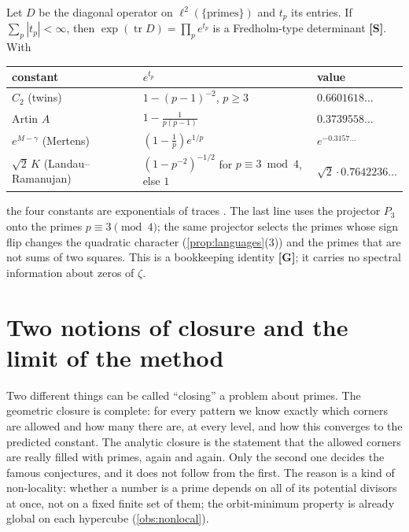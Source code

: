\documentclass[11pt,a4paper]{article}
\newcommand{\statS}{\textsf{\textbf{[S]}}}
\newcommand{\statG}{\textsf{\textbf{[G]}}}
\theoremstyle{plain}
\theoremstyle{definition}
\theoremstyle{remark}
\begin{document}
Let $D$ be the diagonal operator on $\ell^2(\{\text{primes}\})$ and $t_p$ its
entries. If $\sum_p|t_p|<\infty$, then $\exp(\operatorname{tr}D)=\prod_pe^{t_p}$
is a Fredholm-type determinant \statS. With
\begin{center}
\begin{tabular}{lll}\toprule
constant & $e^{t_p}$ & value\\\midrule
$C_2$ (twins) & $1-(p-1)^{-2}$, $p\ge3$ & $0.6601618\ldots$\\
Artin $A$ & $1-\frac1{p(p-1)}$ & $0.3739558\ldots$\\
$e^{M-\gamma}$ (Mertens) & $(1-\frac1p)e^{1/p}$ & $e^{-0.3157\ldots}$\\
$\sqrt2\,K$ (Landau--Ramanujan) & $(1-p^{-2})^{-1/2}$ for $p\equiv3\bmod4$, else $1$ & $\sqrt2\cdot0.7642236\ldots$\\\bottomrule
\end{tabular}
\end{center}
the four constants are exponentials of traces \cite{K-c2,K-trace}. The last
line uses the projector $P_3$ onto the primes $p\equiv3\pmod4$; the same
projector selects the primes whose sign flip changes the quadratic character
(\cref{prop:languages}(3)) and the primes that are not sums of two squares.
This is a bookkeeping identity \statG; it carries no spectral information
about zeros of $\zeta$.

\section{Two notions of closure and the limit of the method}\label{sec:closure}

\begin{plainwords}
Two different things can be called ``closing'' a problem about primes. The
geometric closure is complete: for every pattern we know exactly which
corners are allowed and how many there are, at every level, and how this
converges to the predicted constant. The analytic closure is the statement
that the allowed corners are really filled with primes, again and again.
Only the second one decides the famous conjectures, and it does not follow
from the first. The reason is a kind of non-locality: whether a number is a
prime depends on all of its potential divisors at once, not on a fixed finite
set of them; the orbit-minimum property is already global on each hypercube
(\cref{obs:nonlocal}).
\end{plainwords}
\end{document}
